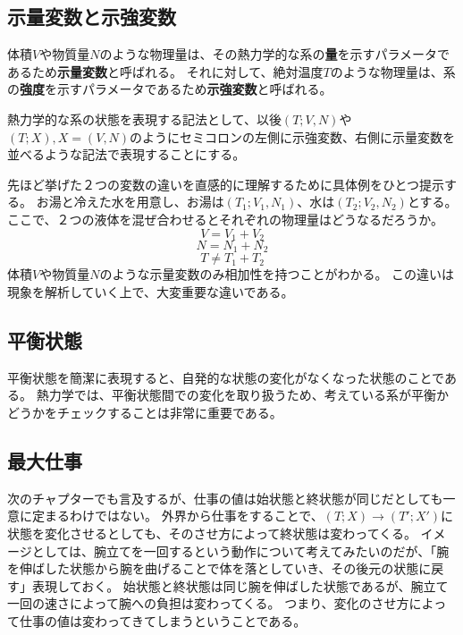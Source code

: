 \documentclass[a4paper]{jsreport}
\begin{document}
            \subsection*{示量変数と示強変数}
                体積$V$や物質量$N$のような物理量は、その熱力学的な系の\textbf{量}を示すパラメータであるため\textbf{示量変数}と呼ばれる。
                それに対して、絶対温度$T$のような物理量は、系の\textbf{強度}を示すパラメータであるため\textbf{示強変数}と呼ばれる。\par
                熱力学的な系の状態を表現する記法として、以後$(T; V, N)$や$(T; X),X=(V, N)$のようにセミコロンの左側に示強変数、右側に示量変数を並べるような記法で表現することにする。\par
                先ほど挙げた２つの変数の違いを直感的に理解するために具体例をひとつ提示する。
                お湯と冷えた水を用意し、お湯は$(T_1; V_1, N_1)$、水は$(T_2; V_2, N_2)$とする。
                ここで、２つの液体を混ぜ合わせるとそれぞれの物理量はどうなるだろうか。
                \begin{equation}
                    V = V_1 + V_2
                \end{equation}   
                \begin{equation}
                    N = N_1 + N_2
                \end{equation}   
                \begin{equation}
                    T \ne T_1 + T_2
                \end{equation}   
                体積$V$や物質量$N$のような示量変数のみ相加性を持つことがわかる。
                この違いは現象を解析していく上で、大変重要な違いである。
            
            \subsection*{平衡状態}
                平衡状態を簡潔に表現すると、自発的な状態の変化がなくなった状態のことである。
                熱力学では、平衡状態間での変化を取り扱うため、考えている系が平衡かどうかをチェックすることは非常に重要である。 

            \subsection*{最大仕事}
                次のチャプターでも言及するが、仕事の値は始状態と終状態が同じだとしても一意に定まるわけではない。
                外界から仕事をすることで、$(T; X)\xrightarrow{}(T'; X')$に状態を変化させるとしても、そのさせ方によって終状態は変わってくる。
                イメージとしては、腕立てを一回するという動作について考えてみたいのだが、「腕を伸ばした状態から腕を曲げることで体を落としていき、その後元の状態に戻す」表現しておく。
                始状態と終状態は同じ腕を伸ばした状態であるが、腕立て一回の速さによって腕への負担は変わってくる。
                つまり、変化のさせ方によって仕事の値は変わってきてしまうということである。
\end{document}
